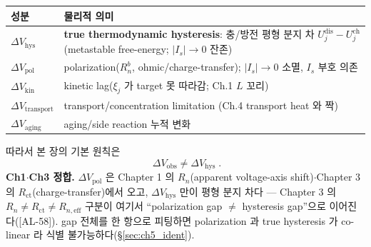 \documentclass[11pt,a4paper]{article}
\newcommand{\eff}{\mathrm{eff}}
\newcommand{\ct}{\mathrm{ct}}
\newcommand{\transp}{\mathrm{transport}}
\newcommand{\dis}{\mathrm{dis}}
\newcommand{\chg}{\mathrm{ch}}
\newcommand{\hys}{\mathrm{hys}}
\newcommand{\pol}{\mathrm{pol}}
\newcommand{\kin}{\mathrm{kin}}
\newcommand{\obs}{\mathrm{obs}}
\newcommand{\AL}[1]{\textsf{[AL-#1]}}
\begin{document}
\begin{longtable}{p{} >{\raggedright\arraybackslash}p{}}
\toprule 성분 & 물리적 의미 \\ \midrule \endhead
$\Delta V_\hys$ & \textbf{true thermodynamic hysteresis}: 충/방전 평형 분지 차 $U_j^\dis-U_j^\chg$ (metastable free-energy; $|I_s|\to0$ 잔존) \\
$\Delta V_\pol$ & polarization($R_n^b$, ohmic/charge-transfer); $|I_s|\to0$ 소멸, $I_s$ 부호 의존 \\
$\Delta V_\kin$ & kinetic lag($\xi_j$ 가 target 못 따라감; Ch.1 $L$ 꼬리) \\
$\Delta V_\transp$ & transport/concentration limitation (Ch.4 transport heat 와 짝) \\
$\Delta V_{\mathrm{aging}}$ & aging/side reaction 누적 변화 \\
\bottomrule
\end{longtable}
따라서 본 장의 기본 원칙은
\begin{equation}
\boxed{\;\Delta V_\obs\ne\Delta V_\hys\;.}
\label{eq:ch5_obs_not_hys}
\end{equation}
\textbf{Ch1$\cdot$Ch3 정합.} $\Delta V_\pol$ 은 Chapter 1 의 $R_n$(apparent voltage-axis shift)$\cdot$Chapter 3
의 $R_\ct$(charge-transfer)에서 오고, $\Delta V_\hys$ 만이 평형 분지 차다 — Chapter 3 의 $R_n\ne R_\ct\ne R_{n,\eff}$
구분이 여기서 ``polarization gap $\ne$ hysteresis gap''으로 이어진다(\AL{58}). gap 전체를 한 항으로 피팅하면
polarization 과 true hysteresis 가 co-linear 라 식별 불가능하다(\S\ref{sec:ch5_ident}).

\end{document}
